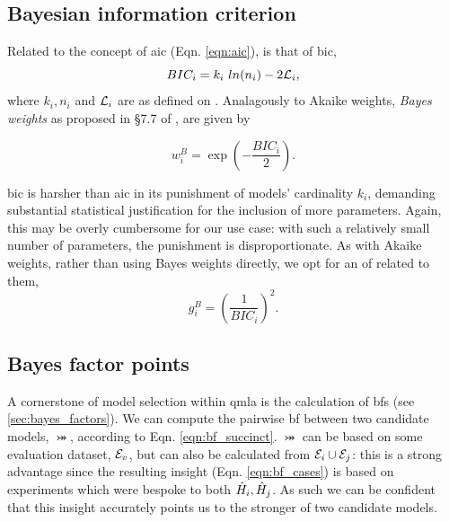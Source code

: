 \par 

\subsection{Bayesian information criterion}\label{sec:bayes_info_criterion}
Related to the concept of \gls{aic} (Eqn. \ref{eqn:aic}), is that of \gls{bic}, 
\begin{equation}
    \label{eqn:bic}
    BIC_i = k_i \ ln(n_i) - 2 {\mathcal{L}}_{i},
\end{equation}
    where $k_i, n_i$ and ${\mathcal{L}}_i$ are as defined on .
Analagously to Akaike weights, 
    \emph{Bayes weights} as proposed in \S7.7 of \cite{friedman2001elements}, are given by

\begin{equation}
    w_i^B = \exp\left( - \frac{BIC_i}{2}  \right).
\end{equation}

\gls{bic} is harsher than \gls{aic} in its punishment of models' cardinality $k_i$, 
    demanding substantial statistical justification for the inclusion of more parameters. 
Again, this may be overly cumbersome for our use case:
    with such a relatively small number of parameters, 
    the punishment is disproportionate.
As with Akaike weights, rather than using Bayes weights directly, 
    we opt for an \gls{of} related to them, 
\begin{equation}
    \label{eqn:bic_fitness}
    g_i^B = \left( \frac{1}{BIC_i}\right)^2.
\end{equation}
    

\subsection{Bayes factor points}\label{sec:bf_points}
A cornerstone of model selection within \gls{qmla} is the calculation of \glspl{bf} (see \cref{sec:bayes_factors}). 
We can compute the pairwise \gls{bf} between two candidate models, $\bij$, according to Eqn. \ref{eqn:bf_succinct}.
$\bij$ can be based on some evaluation dataset, ${ \mathcal{E} }_v$, but can also be calculated from ${ \mathcal{E} }_i \cup { \mathcal{E} }_j$: 
    this is a strong advantage since the resulting insight (Eqn. \ref{eqn:bf_cases}) is based on 
    \glspl{experiment} which were bespoke to both $\hat{H}_i, \hat{H}_j$. 
As such we can be confident that this insight accurately points us to the stronger of two candidate models. 
\par 

